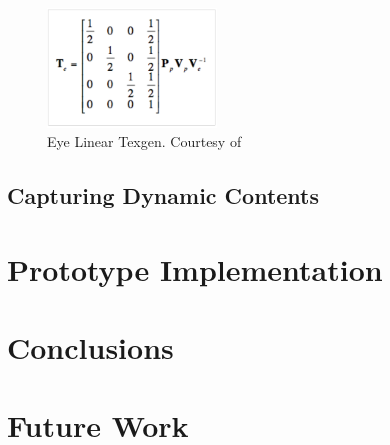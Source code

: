 \documentclass[]{article}
\begin{document}
\begin{figure}[hbtp]
    \centering
    \includegraphics[width=0.4\textwidth]{figures/EyeLinearTexgen.PNG}
    \caption{Eye Linear Texgen. Courtesy of \cite{cassNvidia}}
    \label{fig:EyeLinearTexgen}
\end{figure}

\subsection{Capturing Dynamic Contents}

\section{Prototype Implementation}
\section{Conclusions}
\section{Future Work}

\newpage


\end{document}

